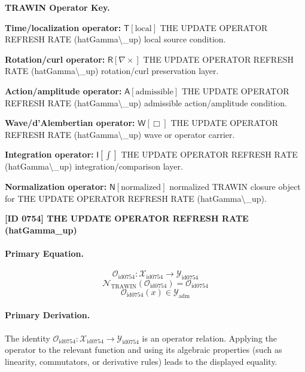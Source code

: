 \par\vspace{0.45\baselineskip}
\noindent\begin{minipage}[t]{\linewidth}
\begingroup
\small
\raggedright
\textbf{TRAWIN Operator Key.}\par
\noindent\textbf{Time/localization operator:} $\mathsf{T}\!\left[\mathrm{local}\right]$ THE UPDATE OPERATOR REFRESH RATE (hatGamma\textbackslash{}\_up) local source condition.\par
\noindent\textbf{Rotation/curl operator:} $\mathsf{R}\!\left[\nabla\times\right]$ THE UPDATE OPERATOR REFRESH RATE (hatGamma\textbackslash{}\_up) rotation/curl preservation layer.\par
\noindent\textbf{Action/amplitude operator:} $\mathsf{A}\!\left[\mathrm{admissible}\right]$ THE UPDATE OPERATOR REFRESH RATE (hatGamma\textbackslash{}\_up) admissible action/amplitude condition.\par
\noindent\textbf{Wave/d'Alembertian operator:} $\mathsf{W}\!\left[\Box\right]$ THE UPDATE OPERATOR REFRESH RATE (hatGamma\textbackslash{}\_up) wave or operator carrier.\par
\noindent\textbf{Integration operator:} $\mathsf{I}\!\left[\int\right]$ THE UPDATE OPERATOR REFRESH RATE (hatGamma\textbackslash{}\_up) integration/comparison layer.\par
\noindent\textbf{Normalization operator:} $\mathsf{N}\!\left[\mathrm{normalized}\right]$ normalized TRAWIN closure object for THE UPDATE OPERATOR REFRESH RATE (hatGamma\textbackslash{}\_up).\par
\endgroup
\end{minipage}

\clearpage
\noindent\textbf{[ID 0754] THE UPDATE OPERATOR REFRESH RATE (hatGamma\_up)}\par
\vspace{0.35em}
\paragraph{Primary Equation.}
\[
\mathcal{O}_{\mathrm{id0754}}:\mathcal{X}_{\mathrm{id0754}}\longrightarrow\mathcal{Y}_{\mathrm{id0754}}
\]
\[
\mathcal{N}_{\mathrm{TRAWIN}}(\mathcal{O}_{\mathrm{id0754}})=\mathcal{O}_{\mathrm{id0754}}
\]
\[
\mathcal{O}_{\mathrm{id0754}}(x)\in\mathcal{Y}_{\mathrm{adm}}
\]

\paragraph{Primary Derivation.}
The identity \( \mathcal{O}_{\mathrm{id0754}}:\mathcal{X}_{\mathrm{id0754}}\longrightarrow\mathcal{Y}_{\mathrm{id0754}} \) is an operator relation. Applying the operator to the relevant function and using its algebraic properties (such as linearity, commutators, or derivative rules) leads to the displayed equality.

